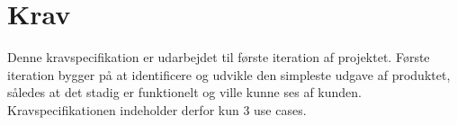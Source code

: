 \chapter{Krav}
Denne kravspecifikation er udarbejdet til første iteration af projektet. Første iteration bygger på at identificere og udvikle den simpleste udgave af produktet, således at det stadig er funktionelt og ville kunne ses af kunden. Kravspecifikationen indeholder derfor kun 3 use cases.








